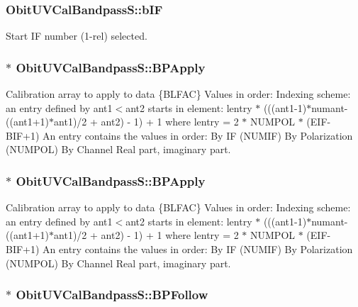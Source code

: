 \subsubsection{ {\bf Obit\-UVCal\-Bandpass\-S::b\-IF}}\label{structObitUVCalBandpassS_o9}


Start IF number (1-rel) selected. 

\subsubsection{$\ast$ {\bf Obit\-UVCal\-Bandpass\-S::BPApply}}\label{structObitUVCalBandpassS_o50}


Calibration array to apply to data \{BLFAC\} Values in order: Indexing scheme: an entry defined by ant1$<$ant2 starts in element: lentry $\ast$ (((ant1-1)$\ast$numant-((ant1+1)$\ast$ant1)/2 + ant2) - 1) + 1 where lentry = 2 $\ast$ NUMPOL $\ast$ (EIF-BIF+1) An entry contains the values in order: By IF (NUMIF) By Polarization (NUMPOL) By Channel Real part, imaginary part. 

\subsubsection{$\ast$ {\bf Obit\-UVCal\-Bandpass\-S::BPApply}}\label{structObitUVCalBandpassS_o30}


Calibration array to apply to data \{BLFAC\} Values in order: Indexing scheme: an entry defined by ant1$<$ant2 starts in element: lentry $\ast$ (((ant1-1)$\ast$numant-((ant1+1)$\ast$ant1)/2 + ant2) - 1) + 1 where lentry = 2 $\ast$ NUMPOL $\ast$ (EIF-BIF+1) An entry contains the values in order: By IF (NUMIF) By Polarization (NUMPOL) By Channel Real part, imaginary part. 

\subsubsection{$\ast$ {\bf Obit\-UVCal\-Bandpass\-S::BPFollow}}\label{structObitUVCalBandpassS_o52}


